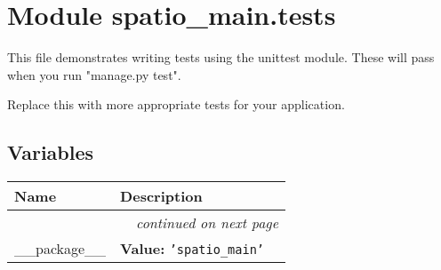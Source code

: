 %
%
%


\section{Module spatio\_main.tests}

    \label{spatio_main:tests}
This file demonstrates writing tests using the unittest module. These will 
pass when you run "manage.py test".

Replace this with more appropriate tests for your application.



  \subsection{Variables}

    \vspace{-1cm}
\hspace{\varindent}\begin{longtable}{|p{\varnamewidth}|p{\vardescrwidth}|l}
\cline{1-2}
\cline{1-2} \centering \textbf{Name} & \centering \textbf{Description}& \\
\cline{1-2}
\endhead\cline{1-2}\multicolumn{3}{r}{\small\textit{continued on next page}}\\\endfoot\cline{1-2}
\endlastfoot\raggedright \_\-\_\-p\-a\-c\-k\-a\-g\-e\-\_\-\_\- & \raggedright \textbf{Value:} 
{\tt \texttt{'}\texttt{spatio\_main}\texttt{'}}&\\
\cline{1-2}
\end{longtable}



